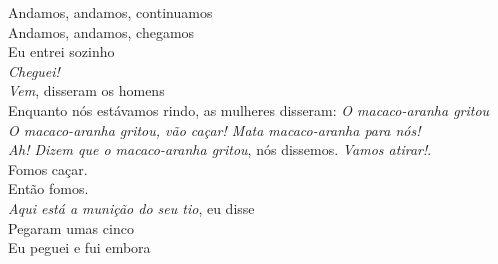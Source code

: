 \begin{linenumbers}\begingroup\raggedright
 
\noindent   Andamos, andamos, continuamos\\
  Andamos, andamos, chegamos\\
  Eu entrei sozinho\\
  \emph{Cheguei!}\\
  \emph{Vem}, disseram os homens\\
  Enquanto nós estávamos rindo, as mulheres disseram: \emph{O macaco-aranha gritou}\\
  \emph{O macaco-aranha gritou, vão caçar! Mata macaco-aranha para nós!}\\
  \emph{Ah! Dizem que o macaco-aranha gritou}, nós dissemos. \emph{Vamos atirar!}.\\
  Fomos caçar.\\
  Então fomos.\\
  \emph{Aqui está a munição do seu tio}, eu disse\\
  Pegaram umas cinco\\
  Eu peguei e fui embora

\end{linenumbers}\endgroup

\bigskip

